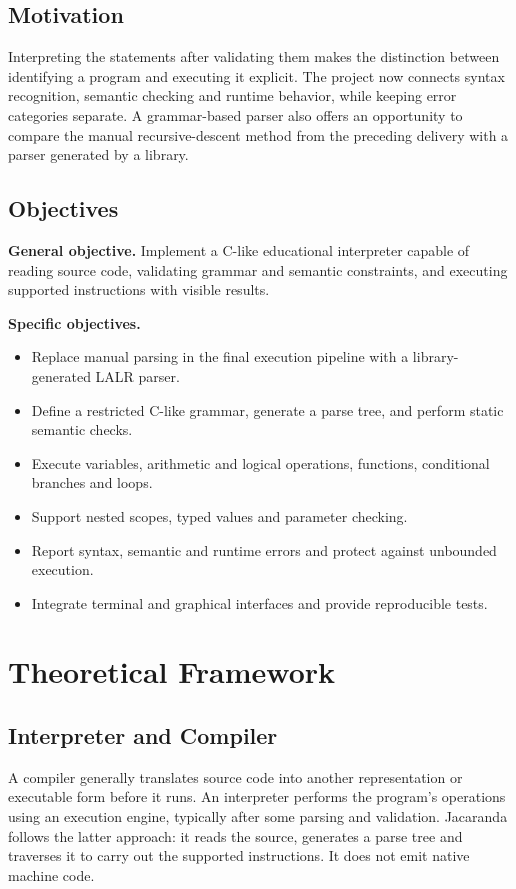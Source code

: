 \documentclass[letterpaper,12pt,oneside]{article}
\begin{document}
\subsection{Motivation}
Interpreting the statements after validating them makes the distinction between identifying a program and executing it explicit. The project now connects syntax recognition, semantic checking and runtime behavior, while keeping error categories separate. A grammar-based parser also offers an opportunity to compare the manual recursive-descent method from the preceding delivery with a parser generated by a library.

\subsection{Objectives}
\textbf{General objective.} Implement a C-like educational interpreter capable of reading source code, validating grammar and semantic constraints, and executing supported instructions with visible results.

\textbf{Specific objectives.}
\begin{itemize}[leftmargin=1.5em]
\item Replace manual parsing in the final execution pipeline with a library-generated LALR parser.
\item Define a restricted C-like grammar, generate a parse tree, and perform static semantic checks.
\item Execute variables, arithmetic and logical operations, functions, conditional branches and loops.
\item Support nested scopes, typed values and parameter checking.
\item Report syntax, semantic and runtime errors and protect against unbounded execution.
\item Integrate terminal and graphical interfaces and provide reproducible tests.
\end{itemize}

\section{Theoretical Framework}
\subsection{Interpreter and Compiler}
A compiler generally translates source code into another representation or executable form before it runs. An interpreter performs the program's operations using an execution engine, typically after some parsing and validation. Jacaranda follows the latter approach: it reads the source, generates a parse tree and traverses it to carry out the supported instructions. It does not emit native machine code.
\end{document}
